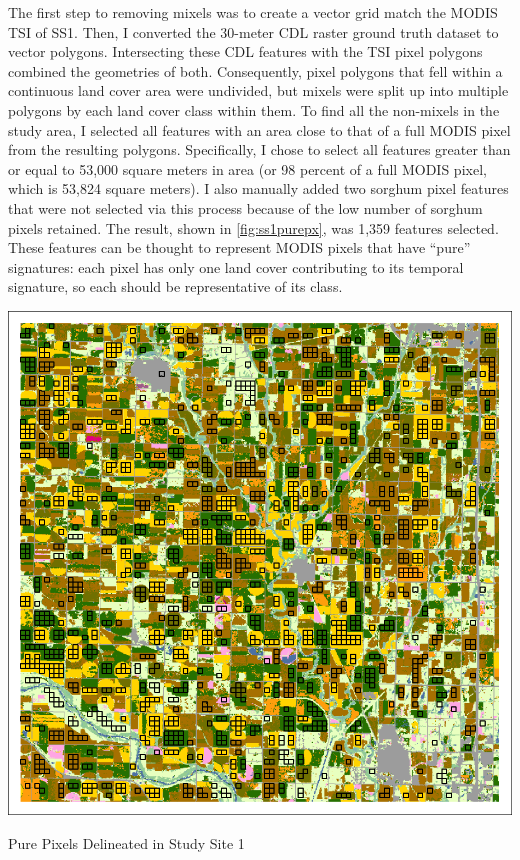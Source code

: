 The first step to removing mixels was to create a vector grid match the MODIS TSI of SS1. Then, I converted the 30-meter CDL raster ground truth dataset to vector polygons. Intersecting these CDL features with the TSI pixel polygons combined the geometries of both. Consequently, pixel polygons that fell within a continuous land cover area were undivided, but mixels were split up into multiple polygons by each land cover class within them. To find all the non-mixels in the study area, I selected all features with an area close to that of a full MODIS pixel from the resulting polygons. Specifically, I chose to select all features greater than or equal to 53,000 square meters in area (or 98 percent of a full MODIS pixel, which is 53,824 square meters). I also manually added two sorghum pixel features that were not selected via this process because of the low number of sorghum pixels retained. The result, shown in \autoref{fig:ss1purepx}, was 1,359 features selected. These features can be thought to represent MODIS pixels that have ``pure'' signatures: each pixel has only one land cover contributing to its temporal signature, so each should be representative of its class.

\begin{ssfigure}
  \centering
  \includegraphics[width=.9\textwidth]{Graphics/Testing/clip1_30mCDL_pure_pixels.pdf}
  \caption{Pure Pixels Delineated in Study Site 1}
  \label{fig:ss1purepx}
\end{ssfigure}

